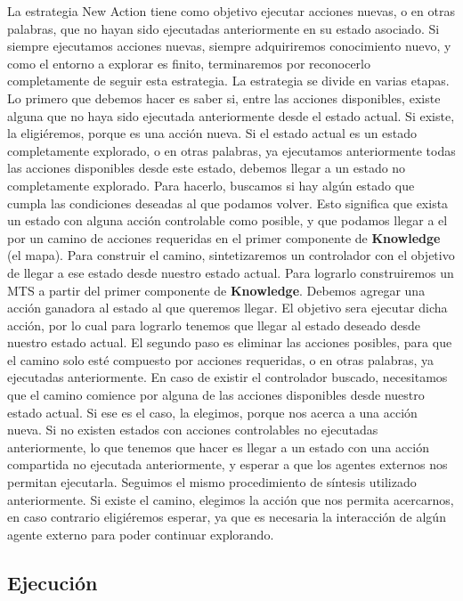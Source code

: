 \vspace{\baselineskip}
La estrategia New Action tiene como objetivo ejecutar acciones nuevas, o en otras palabras, que no hayan sido ejecutadas anteriormente en su estado asociado.
Si siempre ejecutamos acciones nuevas, siempre adquiriremos conocimiento nuevo, y como el entorno a explorar es finito, terminaremos por reconocerlo completamente
de seguir esta estrategia.
La estrategia se divide en varias etapas. Lo primero que debemos hacer es saber si, entre las acciones disponibles, existe alguna que no haya sido ejecutada
anteriormente desde el estado actual. Si existe, la eligiéremos, porque es una acción nueva.
Si el estado actual es un estado completamente explorado, o en otras palabras, ya ejecutamos anteriormente todas las acciones disponibles desde este estado, debemos
llegar a un estado no completamente explorado. Para hacerlo, buscamos si hay algún estado que cumpla las condiciones deseadas al que podamos volver. Esto
significa que exista un estado con alguna acción controlable como posible, y que podamos llegar a el por un camino de acciones requeridas en el primer componente
de \textbf{Knowledge} (el mapa).
Para construir el camino, sintetizaremos un controlador con el objetivo de llegar a ese estado desde nuestro estado actual. Para lograrlo construiremos un MTS
a partir del primer componente de \textbf{Knowledge}. Debemos agregar una acción ganadora al estado al que queremos llegar. El objetivo sera ejecutar dicha acción,
por lo cual para lograrlo tenemos que llegar al estado deseado desde nuestro estado actual. El segundo paso es eliminar las acciones posibles, para que el camino
solo esté compuesto por acciones requeridas, o en otras palabras, ya ejecutadas anteriormente. En caso de existir el controlador buscado, necesitamos que el camino
comience por alguna de las acciones disponibles desde nuestro estado actual. Si ese es el caso, la elegimos, porque nos acerca a una acción nueva.
Si no existen estados con acciones controlables no ejecutadas anteriormente, lo que tenemos que hacer es llegar a un estado con una acción compartida no ejecutada
anteriormente, y esperar a que los agentes externos nos permitan ejecutarla. Seguimos el mismo procedimiento de síntesis utilizado anteriormente. Si existe el camino,
elegimos la acción que nos permita acercarnos, en caso contrario eligiéremos esperar, ya que es necesaria la interacción de algún agente externo para poder continuar
explorando.

\subsection{Ejecución}

